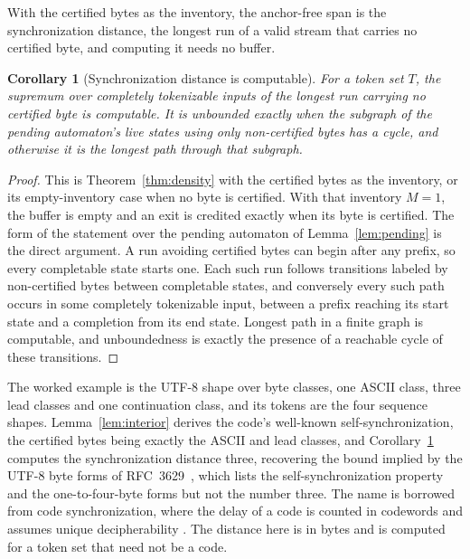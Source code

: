 \documentclass[11pt,a4paper]{article}
\theoremstyle{definition}
\theoremstyle{plain}
\newtheorem{corollary}{Corollary}
\begin{document}
With the certified bytes as the inventory, the anchor-free span is the synchronization distance, the longest run of a
valid stream that carries no certified byte, and computing it needs no buffer.

\begin{corollary}[Synchronization distance is computable]\label{cor:gap}
For a token set $T$, the supremum over completely tokenizable inputs of the longest run carrying no certified byte is
computable. It is unbounded exactly when the subgraph of the pending automaton's live states using only non-certified
bytes has a cycle, and otherwise it is the longest path through that subgraph.
\end{corollary}

\begin{proof}
This is Theorem~\ref{thm:density} with the certified bytes as the inventory, or its empty-inventory case when no byte is
certified. With that inventory $M = 1$, the buffer is empty and an exit is credited exactly when its byte is certified.
The form of the statement over the pending automaton of Lemma~\ref{lem:pending} is the direct argument. A run avoiding
certified bytes can begin after any prefix, so every completable state starts one. Each such run follows transitions
labeled by non-certified bytes between completable states, and conversely every such path occurs in some completely
tokenizable input, between a prefix reaching its start state and a completion from its end state. Longest path in a
finite graph is computable, and unboundedness is exactly the presence of a reachable cycle of these transitions.
\end{proof}

The worked example is the UTF-8 shape over byte classes, one ASCII class, three lead classes and one continuation class,
and its tokens are the four sequence shapes. Lemma~\ref{lem:interior} derives the code's well-known
self-synchronization, the certified bytes being exactly the ASCII and lead classes, and Corollary~\ref{cor:gap} computes
the synchronization distance three, recovering the bound implied by the UTF-8 byte forms of
RFC~3629~\citep{yergeau2003utf8}, which lists the self-synchronization property and the one-to-four-byte forms but not
the number three. The name is borrowed from code synchronization, where the delay of a code is counted in codewords and
assumes unique decipherability \citep{restivo1975synchronization}. The distance here is in bytes and is computed for a
token set that need not be a code.
\end{document}
